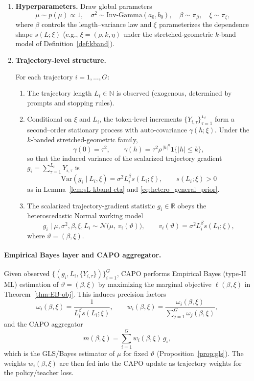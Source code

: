 \documentclass[12pt]{cs}
\theoremstyle{remark}
\begin{document}
\begin{enumerate}
  \item \textbf{Hyperparameters.}  
  Draw global parameters
  \[
    \mu \sim p(\mu)\propto 1,\quad
    \sigma^2 \sim \mathrm{Inv\text{-}Gamma}(a_0,b_0),\quad
    \beta \sim \pi_\beta,\quad
    \xi \sim \pi_\xi,
  \]
  where \(\beta\) controls the length–variance law and \(\xi\) parameterizes the dependence shape \(s(L;\xi)\) (e.g., \(\xi=(\rho,k,\eta)\) under the stretched-geometric $k$-band model of Definition~\ref{def:kband}).
  \item \textbf{Trajectory-level structure.}  

  For each trajectory \(i=1,\dots,G\):
  \begin{enumerate}
    \item The trajectory length \(L_i\in\mathbb N\) is observed (exogenous, determined by prompts and stopping rules).
    \item Conditional on \(\xi\) and \(L_i\), the token-level increments \(\{Y_{i,\tau}\}_{\tau=1}^{L_i}\) form a second–order stationary process with auto-covariance \(\gamma(h;\xi)\). Under the $k$-banded stretched-geometric family,
    \[
      \gamma(0)=\tau^2,\qquad 
      \gamma(h)=\tau^2\rho^{\,|h|^{\eta}}\mathbf 1\{|h|\le k\},
    \]
    so that the induced variance of the scalarized trajectory gradient \(g_i=\sum_{\tau=1}^{L_i} Y_{i,\tau}\) is
    \[
      \mathrm{Var}(g_i\mid L_i,\xi)=\sigma^2 L_i^{\beta} s(L_i;\xi),
      \qquad
      s(L_i;\xi)>0
    \]
    as in Lemma~\ref{lem:sL-kband-eta} and \eqref{eq:hetero_general_prior}.
    \item The scalarized trajectory-gradient statistic \(g_i\in\mathbb R\) obeys the heteroscedastic Normal working model
    \[
      g_i \mid \mu,\sigma^2,\beta,\xi,L_i \sim
      \mathcal N\!\big(\mu,\ v_i(\vartheta)\big),\qquad
      v_i(\vartheta)=\sigma^2 L_i^{\beta} s(L_i;\xi),
    \]
    where \(\vartheta=(\beta,\xi)\).
  \end{enumerate}
\end{enumerate}

\paragraph{Empirical Bayes layer and CAPO aggregator.}
Given observed \(\{(g_i,L_i,\{Y_{i,\tau}\})\}_{i=1}^G\), CAPO performs Empirical Bayes (type-II ML) estimation of \(\vartheta=(\beta,\xi)\) by maximizing the marginal objective \(\ell(\beta,\xi)\) in Theorem~\ref{thm:EB-obj}.  
This induces precision factors
\[
  \omega_i(\beta,\xi)
  = \frac{1}{L_i^{\beta} s(L_i;\xi)},\qquad
  w_i(\beta,\xi)
  = \frac{\omega_i(\beta,\xi)}{\sum_{j=1}^G \omega_j(\beta,\xi)},
\]
and the CAPO aggregator
\[
  m(\beta,\xi) = \sum_{i=1}^G w_i(\beta,\xi)\,g_i,
\]
which is the GLS/Bayes estimator of \(\mu\) for fixed \(\vartheta\) (Proposition~\ref{prop:gls}).  
The weights \(w_i(\beta,\xi)\) are then fed into the CAPO update as trajectory weights for the policy/teacher loss.
\end{document}
